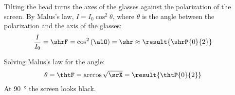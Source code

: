 \begin{abcliste}
\abc Tilting the head turns the axes of the glasses against the polarization of the screen. By Malus's law, $I = I_0\cos^2\theta$, where $\theta$ is the angle between the polarization and the axis of the glasses:
\begin{align}
 \frac{I}{I_0} &= \shrF = \cos^2\left(\alO\right) = \shr \approx \result{\shrP{0}{2}}
\end{align}

\abc Solving Malus's law for the angle:
\begin{align}
 \theta &= \thtF = \arccos\sqrt{\srX} = \result{\thtP{0}{2}}
\end{align}
At \SI{90}{\degree} the screen looks black.
\end{abcliste}
